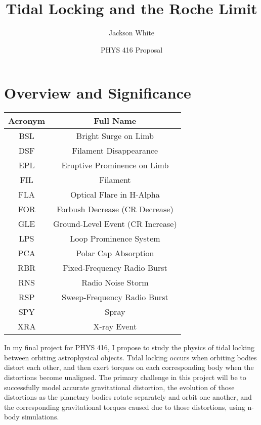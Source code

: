 \documentclass{article}
\title{Tidal Locking and the Roche Limit}
\author{Jackson White}
\date{PHYS 416 Proposal}
\begin{document}
\twocolumn

\maketitle

\section{Overview and Significance}


\begin{center}
 \begin{tabular}{||c | c ||} 
 \hline
 Acronym & Full Name \\ [0.5ex] 
 \hline\hline
 BSL & Bright Surge on Limb \\
 \hline
 DSF & Filament Disappearance \\ 
 \hline
    EPL & Eruptive Prominence on Limb\\
 \hline
    FIL & Filament\\
 \hline
    FLA & Optical Flare in H-Alpha\\
 \hline
    FOR & Forbush Decrease (CR Decrease) \\
 \hline
    GLE & Ground-Level Event (CR Increase) \\
 \hline
    LPS & Loop Prominence System\\
 \hline
    PCA & Polar Cap Absorption\\
 \hline
    RBR & Fixed-Frequency Radio Burst\\
 \hline
    RNS & Radio Noise Storm\\
 \hline
    RSP & Sweep-Frequency Radio Burst\\
 \hline
    SPY & Spray\\
 \hline
    XRA & X-ray Event \\
 \hline
\end{tabular}
\end{center}


In my final project for PHYS 416, I propose to study the physics of tidal locking between orbiting astrophysical objects. Tidal locking occurs when orbiting bodies distort each other, and then exert torques on each corresponding body when the distortions become unaligned. The primary challenge in this project will be to successfully model accurate gravitational distortion, the evolution of those distortions as the planetary bodies rotate separately and orbit one another, and the corresponding gravitational torques caused due to those distortions, using n-body simulations. 
\end{document}
